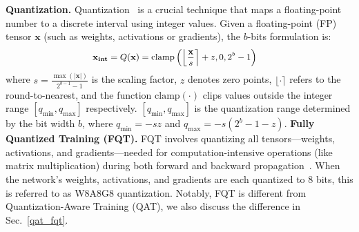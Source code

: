 \noindent\textbf{Quantization.} Quantization~\citep{Jacob_2018_CVPR} is a crucial technique that maps a floating-point number to a discrete interval using integer values. Given a floating-point (FP) tensor $\mathbf{x}$ (such as weights, activations or gradients),
the $b$-bits formulation is:
\begin{equation*}
\small
\begin{aligned}
\label{eq:quant}
    \mathbf{\mathbf{x}_{int}} = Q(\mathbf{x}) & = \mathrm{clamp}\left(\left\lfloor \frac{\mathbf{x}}{s} \right\rceil + z, 0, 2^b - 1\right) 
\vspace{-2mm}
\end{aligned}
\end{equation*}
where $s = \frac{\max(|\mathbf{x}|)}{2^{b-1}-1}$ is the scaling factor, $z$ denotes zero points, $\lfloor \cdot \rceil$ refers to the round-to-nearest, and the function $\mathrm{clamp}(\cdot)$ clips values outside the integer range $\left[q_{\min}, q_{\max} \right]$ respectively. $\left[q_{\min}, q_{\max} \right]$ is the quantization range determined by the bit width $b$, where $q_{\min}=-sz$ and $q_{\max}=-s(2^b-1-z)$. 
\noindent\textbf{Fully Quantized Training (FQT).} FQT involves quantizing all tensors—weights, activations, and gradients—needed for computation-intensive operations (like matrix multiplication) during both forward and backward propagation~\cite{wang2018training,yang2020training,zhu2020towards}. When the network's weights, activations, and gradients are each quantized to 8 bits, this is referred to as W8A8G8 quantization. Notably, FQT is different from Quantization-Aware Training (QAT), we also discuss the difference in Sec.~\ref{qat_fqt}.